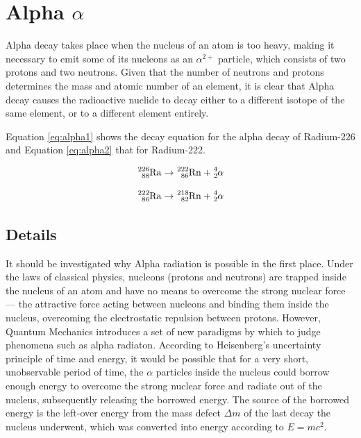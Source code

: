 \pagebreak

\section*{Alpha $\alpha$}

Alpha decay takes place when the nucleus of an atom is too heavy, making it necessary to emit some of its nucleons as an $\alpha^{2+}$ particle, which consists of two protons and two neutrons. Given that the number of neutrons and protons determines the mass and atomic number of an element, it is clear that Alpha decay causes the radioactive nuclide to decay either to a different isotope of the same element, or to a different element entirely.

Equation \ref{eq:alpha1} shows the decay equation for the alpha decay of Radium-226 and Equation \ref{eq:alpha2} that for Radium-222.

\begin{equation}
  \ce{^{226}_{88}Ra} \rightarrow \ce{^{222}_{86}Rn} + \ce{^{4}_{2}\alpha}
  \label{eq:alpha1}
\end{equation}

\begin{equation}
  \ce{^{222}_{86}Ra} \rightarrow \ce{^{218}_{82}Rn} + \ce{^{4}_{2}\alpha}
  \label{eq:alpha2}
\end{equation}

\subsection*{Details}

It should be investigated why Alpha radiation is possible in the first place. Under the laws of classical physics, nucleons (protons and neutrons) are trapped inside the nucleus of an atom and have no means to overcome the strong nuclear force --- the attractive force acting between nucleons and binding them inside the nucleus, overcoming the electrostatic repulsion between protons. However, Quantum Mechanics introduces a set of new paradigms by which to judge phenomena such as alpha radiaton. According to Heisenberg's uncertainty principle of time and energy, it would be possible that for a very short, unobservable period of time, the $\alpha$ particles inside the nucleus could borrow enough energy to overcome the strong nuclear force and radiate out of the nucleus, subsequently releasing the borrowed energy. The source of the borrowed energy is the left-over energy from the mass defect $\Delta m$ of the last decay the nucleus underwent, which was converted into energy according to $E = mc^2$. 

